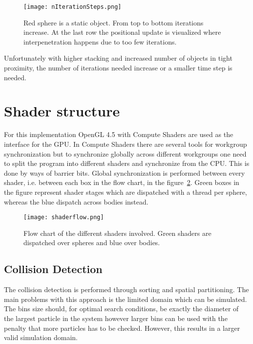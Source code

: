 \begin{figure}[H]
  \centering
  \texttt{[image: nIterationSteps.png]}
  \caption{Red sphere is a static object. From top to bottom iterations increase. At the last row the positional update is visualized where interpenetration happens due to too few iterations.}
  \label{fig:iters}
\end{figure}

Unfortunately with higher stacking and increased number of objects in tight proximity,
the number of iterations needed increase or a smaller time step is needed.

\section{Shader structure}
For this implementation OpenGL 4.5 with Compute Shaders are used as the interface
for the GPU. In Compute Shaders there are several tools for workgroup synchronization
but to synchronize globally across different workgroups one need to split the program into
different shaders and synchronize from the CPU. This is done by ways of barrier bits. Global synchronization
is performed between every shader, i.e. between each box in the flow chart, in the figure~\ref{fig:flow}. Green
boxes in the figure represent shader stages which are dispatched with a thread per
sphere, whereas the blue dispatch across bodies instead.

\begin{figure}[H]
  \centering
  \texttt{[image: shaderflow.png]}
  \caption{Flow chart of the different shaders involved. Green shaders are dispatched over spheres and blue over bodies.}
  \label{fig:flow}
\end{figure}

\subsection{Collision Detection}
The collision detection is performed through sorting and spatial partitioning.
The main problems with this approach is the limited domain which can be simulated.
The bins size should, for optimal search conditions, be exactly the diameter of the largest
particle in the system however larger bins can be used with the penalty that more
particles has to be checked. However, this results in a larger valid simulation domain.

